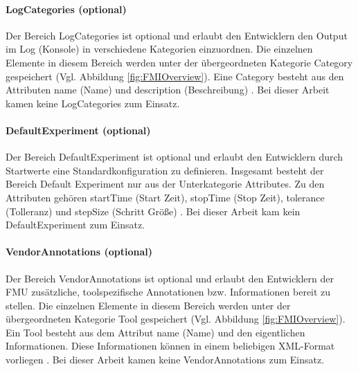 \paragraph{LogCategories (optional)}\label{sec:LogCategories}
\noindent Der Bereich LogCategories ist optional und erlaubt den Entwicklern den Output im Log (Konsole) in verschiedene Kategorien einzuordnen. Die einzelnen Elemente in diesem Bereich werden unter der übergeordneten Kategorie Category gespeichert (Vgl. Abbildung \ref{fig:FMIOverview}). Eine Category besteht aus den Attributen name (Name) und description (Beschreibung) \cite[S.43]{25}.
\newline
Bei dieser Arbeit kamen keine LogCategories zum Einsatz.

\paragraph{DefaultExperiment (optional)}\label{sec:DefaultExperiment}
\noindent Der Bereich DefaultExperiment ist optional und erlaubt den Entwicklern durch Startwerte eine Standardkonfiguration zu definieren. Insgesamt besteht der Bereich Default Experiment nur aus der Unterkategorie Attributes. Zu den Attributen gehören startTime (Start Zeit), stopTime (Stop Zeit), tolerance (Tolleranz) und stepSize (Schritt Größe) \cite[S.44]{25}.
\newline
Bei dieser Arbeit kam kein DefaultExperiment zum Einsatz.

\paragraph{VendorAnnotations (optional)}\label{sec:VendorAnnotations}
\noindent Der Bereich VendorAnnotations ist optional und erlaubt den Entwicklern der FMU zusätzliche, toolspezifische Annotationen bzw. Informationen bereit zu stellen. Die einzelnen Elemente in diesem Bereich werden unter der übergeordneten Kategorie Tool gespeichert (Vgl. Abbildung \ref{fig:FMIOverview}). Ein Tool besteht aus dem Attribut name (Name) und den eigentlichen Informationen. Diese Informationen können in einem beliebigen XML-Format vorliegen \cite[S.45]{25}.
\newline
Bei dieser Arbeit kamen keine VendorAnnotations zum Einsatz.

